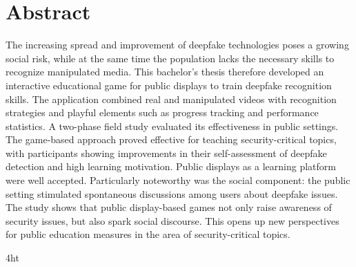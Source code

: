 \documentclass[a4paper, twoside, bibliography=totoc, headsepline, cleardoublepage=empty, parskip=half, draft=false]{scrbook}
\let\ifdeutsch\iffalse
\begin{document}
\section*{Abstract}
The increasing spread and improvement of deepfake technologies poses a growing social risk, 
while at the same time the population lacks the necessary skills to recognize manipulated media.
This bachelor's thesis therefore developed an interactive educational game for public displays to train deepfake recognition skills. 
The application combined real and manipulated videos with recognition strategies and playful elements such as progress tracking and performance statistics.
A two-phase field study evaluated its effectiveness in public settings. 
The game-based approach proved effective for teaching security-critical topics, 
with participants showing improvements in their self-assessment of deepfake detection and high learning motivation. 
Public displays as a learning platform were well accepted.
Particularly noteworthy was the social component: 
the public setting stimulated spontaneous discussions among users about deepfake issues.
The study shows that public display-based games not only raise awareness of security issues, but also spark social discourse.
This opens up new perspectives for public education measures in the area of security-critical topics.

\cleardoublepage



\iftex4ht
\else
\fi

%
%

%
%
%
\tableofcontents


\listoffigures
\listoftables

\let\iflistings\iffalse
\iflistings
  \ifdeutsch
  \else
  \fi
\fi
\end{document}
